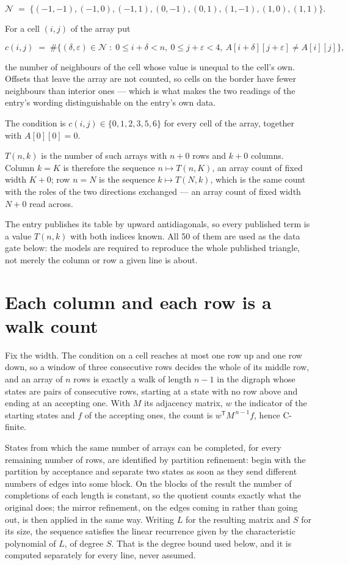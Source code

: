 \documentclass[11pt]{article}
\theoremstyle{definition}
\begin{document}
\[\mathcal{N} \;=\; \{(-1,-1), (-1,0), (-1,1), (0,-1), (0,1), (1,-1), (1,0), (1,1)\}.\]

For a cell $(i,j)$ of the array put

\[c(i,j) \;=\; \#\bigl\{(\delta,\varepsilon)\in\mathcal{N} \;:\; 0\le i+\delta<n,\ 0\le j+\varepsilon<4,\ A[i+\delta][j+\varepsilon] \neq A[i][j]\bigr\},\]

the number of neighbours of the cell whose value is unequal to the cell's own. Offsets that leave the array are not counted, so cells on the border have fewer neighbours than interior ones --- which is what makes the two readings of the entry's wording distinguishable on the entry's own data.

The condition is $c(i,j) \in \{0, 1, 2, 3, 5, 6\}$ for every cell of the array, together with $A[0][0]=0$.

$T(n,k)$ is the number of such arrays with $n + 0$ rows and $k + 0$ columns. Column $k = K$ is therefore the sequence $n \mapsto T(n,K)$, an array count of fixed width $K + 0$; row $n = N$ is the sequence $k \mapsto T(N,k)$, which is the same count with the roles of the two directions exchanged --- an array count of fixed width $N + 0$ read across.

The entry publishes its table by upward antidiagonals, so every published term is a value $T(n,k)$ with both indices known. All 50 of them are used as the data gate below: the models are required to reproduce the whole published triangle, not merely the column or row a given line is about.

\section{Each column and each row is a walk count}

Fix the width. The condition on a cell reaches at most one row up and one row down, so a window of three consecutive rows decides the whole of its middle row, and an array of $n$ rows is exactly a walk of length $n-1$ in the digraph whose states are pairs of consecutive rows, starting at a state with no row above and ending at an accepting one. With $M$ its adjacency matrix, $w$ the indicator of the starting states and $f$ of the accepting ones, the count is $w^{\mathsf T}M^{\,n-1}f$, hence C-finite.

States from which the same number of arrays can be completed, for every remaining number of rows, are identified by partition refinement: begin with the partition by acceptance and separate two states as soon as they send different numbers of edges into some block. On the blocks of the result the number of completions of each length is constant, so the quotient counts exactly what the original does; the mirror refinement, on the edges coming in rather than going out, is then applied in the same way. Writing $L$ for the resulting matrix and $S$ for its size, the sequence satisfies the linear recurrence given by the characteristic polynomial of $L$, of degree $S$. That is the degree bound used below, and it is computed separately for every line, never assumed.
\end{document}
